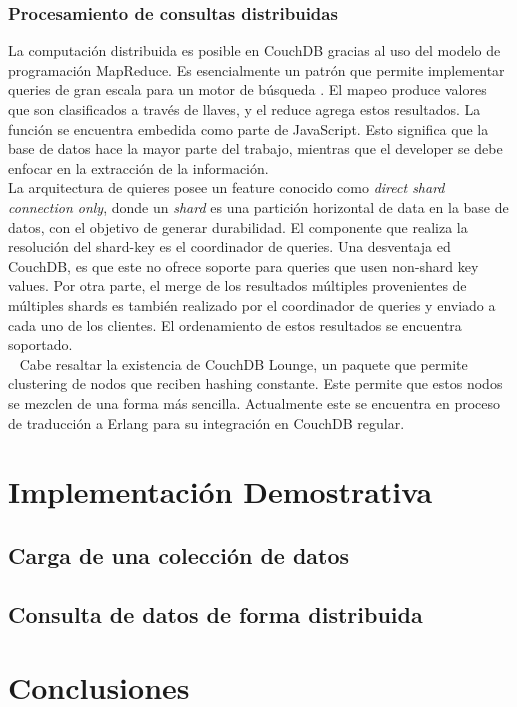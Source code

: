 \documentclass{article}
\begin{document}
            \subsubsection{Procesamiento de consultas distribuidas}
                La computación distribuida es posible en CouchDB gracias al uso del modelo de programación MapReduce. Es esencialmente un patrón que permite implementar queries de gran escala para un motor de búsqueda \cite{sciabrra}. El mapeo produce valores que son clasificados a través de llaves, y el reduce agrega estos resultados. La función se encuentra embedida como parte de JavaScript. Esto significa que la base de datos hace la mayor parte del trabajo, mientras que el developer se debe enfocar en la extracción de la información. \\ 
                La arquitectura de quieres posee un feature conocido como \textit{direct shard connection only}, donde un \textit{shard} es una partición horizontal de data en la base de datos, con el objetivo de generar durabilidad. El componente que realiza la resolución del shard-key es el coordinador de queries. Una desventaja ed CouchDB, es que este no ofrece soporte para queries que usen non-shard key values. Por otra parte, el merge de los resultados múltiples provenientes de múltiples shards es también realizado por el coordinador de queries y enviado a cada uno de los clientes. El ordenamiento de estos resultados se encuentra soportado. \\ 
                Cabe resaltar la existencia de CouchDB Lounge, un paquete que permite clustering de nodos que reciben hashing constante. Este permite que estos nodos se mezclen de una forma más sencilla. Actualmente este se encuentra en proceso de traducción a Erlang para su integración en CouchDB regular. 
    \section{Implementación Demostrativa}
        \subsection{Carga de una colección de datos}
        \subsection{Consulta de datos de forma distribuida}
    \section{Conclusiones}

    \newpage

    
    
\end{document}
